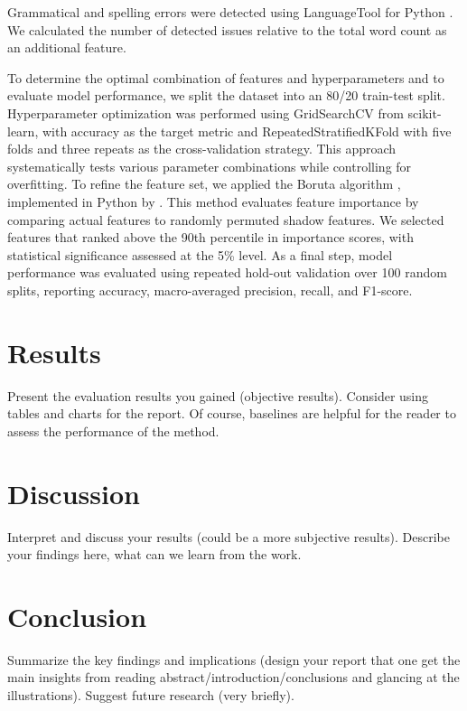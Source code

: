\documentclass[12pt,a4paper,twocolumn]{article}
\begin{document}
Grammatical and spelling errors were detected using LanguageTool for Python \citep{ltp}. We calculated the number of detected issues relative to the total word count as an additional feature.


To determine the optimal combination of features and hyperparameters and to evaluate model performance, we split the dataset into an 80/20 train-test split. Hyperparameter optimization was performed using GridSearchCV from scikit-learn, with accuracy as the target metric and RepeatedStratifiedKFold with five folds and three repeats as the cross-validation strategy. This approach systematically tests various parameter combinations while controlling for overfitting. To refine the feature set, we applied the Boruta algorithm \citep{boruta1}, implemented in Python by \citet{boruta2}. This method evaluates feature importance by comparing actual features to randomly permuted shadow features. We selected features that ranked above the 90th percentile in importance scores, with statistical significance assessed at the 5\% level. As a final step, model performance was evaluated using repeated hold-out validation over 100 random splits, reporting accuracy, macro-averaged precision, recall, and F1-score.


\section{Results}
\label{sec:results}
Present the evaluation results you gained (objective results). 
Consider using tables and charts for the report.
Of course, baselines are helpful for the reader to assess the performance of the method.

\section{Discussion}
\label{sec:discussion}
Interpret and discuss your results (could be a more subjective results).
Describe your findings here, what can we learn from the work.

\section{Conclusion}
\label{sec:conclusion}
Summarize the key findings and implications (design your report that one get the main insights from reading abstract/introduction/conclusions and glancing at the illustrations). 
Suggest future research (very briefly).


\newpage
\end{document}
